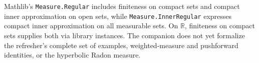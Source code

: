 Mathlib's \texttt{Measure.Regular} includes finiteness on compact sets and compact inner approximation on open sets, while \texttt{Measure.InnerRegular} expresses compact inner approximation on all measurable sets. On $\mathbb R$, finiteness on compact sets supplies both via library instances. The companion does not yet formalize the refresher's complete set of examples, weighted-measure and pushforward identities, or the hyperbolic Radon measure.
